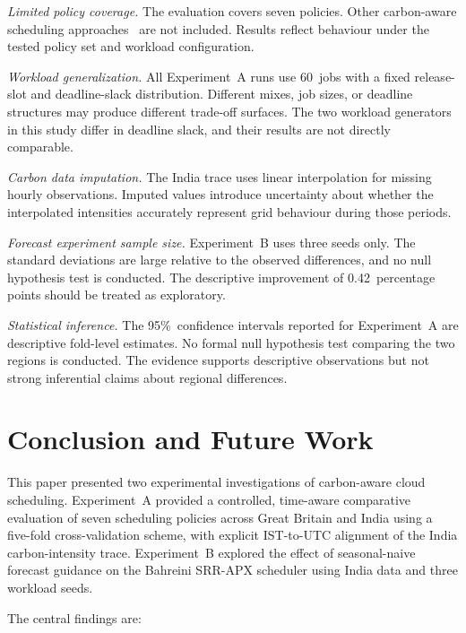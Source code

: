 \documentclass[conference]{IEEEtran}
\begin{document}
\textit{Limited policy coverage.} The evaluation covers seven policies. Other
carbon-aware scheduling approaches~\cite{hanafy2024gaia,hanafy2024carbonscaler,
radovanovic2023} are not included. Results reflect behaviour under the tested
policy set and workload configuration.

\textit{Workload generalization.} All Experiment~A runs use 60~jobs with a
fixed release-slot and deadline-slack distribution. Different mixes, job sizes,
or deadline structures may produce different trade-off surfaces. The two
workload generators in this study differ in deadline slack, and their results
are not directly comparable.

\textit{Carbon data imputation.} The India trace uses linear interpolation for
missing hourly observations. Imputed values introduce uncertainty about
whether the interpolated intensities accurately represent grid behaviour during
those periods.

\textit{Forecast experiment sample size.} Experiment~B uses three seeds only.
The standard deviations are large relative to the observed differences, and no
null hypothesis test is conducted. The descriptive improvement of
0.42~percentage points should be treated as exploratory.

\textit{Statistical inference.} The 95\%~confidence intervals reported
for Experiment~A are descriptive fold-level estimates. No formal null hypothesis
test comparing the two regions is conducted. The evidence supports descriptive
observations but not strong inferential claims about regional differences.

\section{Conclusion and Future Work}
\label{sec:conclusion}

This paper presented two experimental investigations of carbon-aware cloud
scheduling. Experiment~A provided a controlled, time-aware comparative
evaluation of seven scheduling policies across Great Britain and India using a
five-fold cross-validation scheme, with explicit IST-to-UTC alignment of the
India carbon-intensity trace. Experiment~B explored the effect of seasonal-naive
forecast guidance on the Bahreini SRR-APX scheduler using India data and three
workload seeds.

The central findings are:
\end{document}
